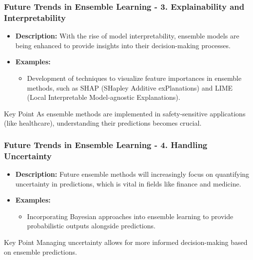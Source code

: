 \documentclass[aspectratio=169]{beamer}
\begin{document}
\begin{frame}[fragile]
    \frametitle{Future Trends in Ensemble Learning - 3. Explainability and Interpretability}
    \begin{itemize}
        \item \textbf{Description:} With the rise of model interpretability, ensemble models are being enhanced to provide insights into their decision-making processes.
        \item \textbf{Examples:} 
        \begin{itemize}
            \item Development of techniques to visualize feature importances in ensemble methods, such as SHAP (SHapley Additive exPlanations) and LIME (Local Interpretable Model-agnostic Explanations).
        \end{itemize}
    \end{itemize}
    \begin{block}{Key Point}
        As ensemble methods are implemented in safety-sensitive applications (like healthcare), understanding their predictions becomes crucial.
    \end{block}
\end{frame}

\begin{frame}[fragile]
    \frametitle{Future Trends in Ensemble Learning - 4. Handling Uncertainty}
    \begin{itemize}
        \item \textbf{Description:} Future ensemble methods will increasingly focus on quantifying uncertainty in predictions, which is vital in fields like finance and medicine.
        \item \textbf{Examples:}
        \begin{itemize}
            \item Incorporating Bayesian approaches into ensemble learning to provide probabilistic outputs alongside predictions.
        \end{itemize}
    \end{itemize}
    \begin{block}{Key Point}
        Managing uncertainty allows for more informed decision-making based on ensemble predictions.
    \end{block}
\end{frame}
\end{document}
